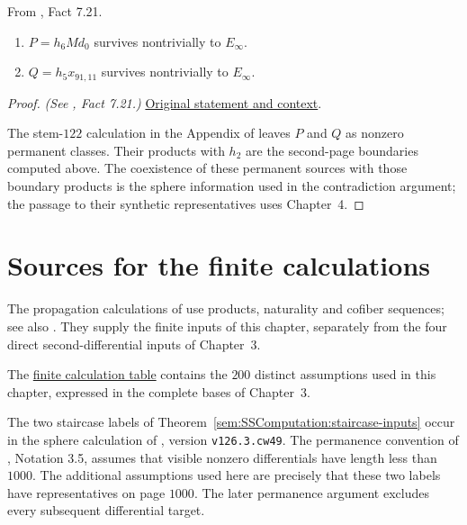 \begin{fact}
\label{paper:7.21}
From \cite{LWX126}, Fact 7.21.\par

\label{fact:stem122}
\begin{enumerate}
    \item $P=h_6Md_0$ survives nontrivially to $E_\infty$.
    \item $Q=h_5x_{91,11}$ survives nontrivially to $E_\infty$.
\end{enumerate}




\end{fact}
\begin{proof}
\textit{(See \cite{LWX126}, Fact 7.21.)} \href{paper/main.tex.html#L2689}{Original statement and context}.

The stem-$122$ calculation in the Appendix of \cite{LWX126} leaves
$P$ and $Q$ as nonzero permanent classes. Their products with $h_2$
are the second-page boundaries computed above. The coexistence of
these permanent sources with those boundary products is the sphere
information used in the contradiction argument; the passage to their
synthetic representatives uses Chapter~4.
\end{proof}

\section{Sources for the finite calculations}

The propagation calculations of \cite{LinProgram} use products,
naturality and cofiber sequences; see also
\cite{LWXZenodoCurrent,LWXMachine}. They supply the finite inputs of
this chapter, separately from the four direct second-differential
inputs of Chapter~3.

The \href{paper/finite-calculations.html}{finite calculation table}
contains the $200$ distinct assumptions used in this chapter, expressed
in the complete bases of Chapter~3.

The two staircase labels of
Theorem~\ref{sem:SSComputation:staircase-inputs} occur in the sphere
calculation of \cite{LWXZenodoCurrent}, version
\texttt{v126.3.cw49}. The permanence convention of
\cite{LWXMachine}, Notation 3.5, assumes that visible nonzero
differentials have length less than $1000$. The additional assumptions
used here are precisely that these two labels have representatives on
page $1000$. The later permanence argument excludes every subsequent differential target.
